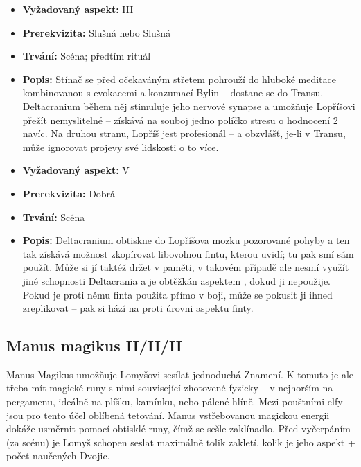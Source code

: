 \documentclass[../main.tex]{subfiles}
\begin{document}
\begin{specialita}[Trans, II]
\begin{itemize}
	\item \textbf{Vyžadovaný aspekt:} III
	\item \textbf{Prerekvizita:} Slušná  nebo Slušná 
	\item \textbf{Trvání:} Scéna; předtím rituál
	\item \textbf{Popis:} Stínač se před očekaváným střetem pohrouží do hluboké meditace kombinovanou s evokacemi a konzumací Bylin – dostane se do Transu. Deltacranium během něj stimuluje jeho nervové synapse a umožňuje Lopříšovi přežít nemyslitelné – získává na souboj jedno políčko stresu o hodnocení 2 navíc. Na druhou stranu, Lopříš jest profesionál – a obzvlášť, je-li v Transu, může ignorovat projevy své lidskosti o to více.
\end{itemize}
\end{specialita}

\begin{specialita}[Sharingan, II]
\begin{itemize}
	\item \textbf{Vyžadovaný aspekt:} V
	\item \textbf{Prerekvizita:} Dobrá 
	\item \textbf{Trvání:} Scéna
	\item \textbf{Popis:} Deltacranium obtiskne do Lopříšova mozku pozorované pohyby a ten tak získává možnost zkopírovat libovolnou fintu, kterou uvidí; tu pak smí sám použít. Může si jí taktéž držet v paměti, v takovém případě ale nesmí využít jiné schopnosti Deltacrania a je obtěžkán aspektem , dokud ji nepoužije. Pokud je proti němu finta použita přímo v boji, může se pokusit ji ihned zreplikovat – pak si hází na  proti úrovni aspektu finty.
\end{itemize}
\end{specialita}


\subsection{Manus magikus II/II/II}
\label{sec:lopr-manus}

Manus Magikus umožňuje Lomyšovi sesílat jednoduchá Znamení. K tomuto je ale třeba mít magické runy s nimi související zhotovené fyzicky – v nejhorším na pergamenu, ideálně na plíšku, kamínku, nebo pálené hlíně. Mezi pouštními elfy jsou pro tento účel oblíbená tetování. Manus vstřebovanou magickou energii dokáže usměrnit pomocí obtisklé runy, čímž se sešle zaklínadlo. Před vyčerpáním (za scénu) je Lomyš schopen seslat maximálně tolik zakletí, kolik je jeho aspekt + počet naučených Dvojic.
\end{document}

